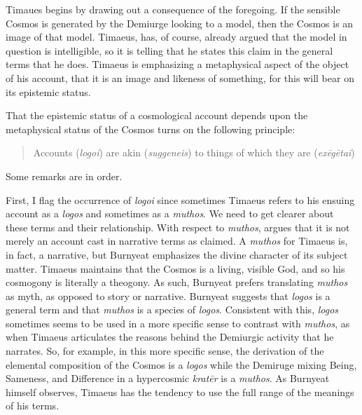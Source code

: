 Timaues begins by drawing out a consequence of the foregoing. If the sensible Cosmos is generated by the Demiurge looking to a model, then the Cosmos is an image of that model. Timaeus, has, of course, already argued that the model in question is intelligible, so it is telling that he states this claim in the general terms that he does. Timaeus is emphasizing a metaphysical aspect of the object of his account, that it is an image and likeness of something, for this will bear on its epistemic status.

That the epistemic status of a cosmological account depends upon the metaphysical status of the Cosmos turns on the following principle:
\begin{quote}
	Accounts (\emph{logoi}) are akin (\emph{suggeneis}) to things of which they are (\emph{exēgētai})
\end{quote}
Some remarks are in order.

First, I flag the occurrence of \emph{logoi} since sometimes Timaeus refers to his ensuing account as a \emph{logos} and sometimes as a \emph{muthos}. We need to get clearer about these terms and their relationship. With respect to \emph{muthos}, \citet[144--5]{Burnyeat:2005it} argues that it is not merely an account cast in narrative terms as \citet[71--3]{Vlastos:1939td} claimed. A \emph{muthos} for Timaeus is, in fact, a narrative, but Burnyeat emphasizes the divine character of its subject matter. Timaeus maintains that the Cosmos is a living, visible God, and so his cosmogony is literally a theogony. As such, Burnyeat prefers translating \emph{muthos} as myth, as opposed to story or narrative. Burnyeat suggests that \emph{logos} is a general term and that \emph{muthos} is a species of \emph{logos}. Consistent with this, \emph{logos} sometimes seems to be used in a more specific sense to contrast with \emph{muthos}, as when Timaeus articulates the reasons behind the Demiurgic activity that he narrates. So, for example, in this more specific sense, the derivation of the elemental composition of the Cosmos is a \emph{logos} while the Demiruge mixing Being, Sameness, and Difference in a hypercosmic \emph{kratēr} is a \emph{muthos}. As Burnyeat himself observes, Timaeus has the tendency to use the full range of the meanings of his terms.

